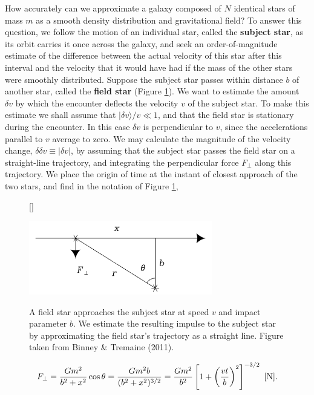 \documentclass[a4paper,10pt]{article}
\begin{document}
{\noindent}How accurately can we approximate a galaxy composed of $N$ identical stars of mass $m$ as a smooth density distribution and gravitational field? To answer this question, we follow the motion of an individual star, called the \textbf{subject star}, as its orbit carries it once across the galaxy, and seek an order-of-magnitude estimate of the difference between the actual velocity of this star after this interval and the velocity that it would have had if the mass of the other stars were smoothly distributed. Suppose the subject star passes within distance $b$ of another star, called the \textbf{field star} (Figure \ref{fig:fieldstar}). We want to estimate the amount $\delta v$ by which the encounter deflects the velocity $v$ of the subject star. To make this estimate we shall assume that $\lvert\delta v\rangle/v\ll1$, and that the field star is stationary during the encounter. In this case $\delta v$ is perpendicular to $v$, since the accelerations parallel to $v$ average to zero. We may calculate the magnitude of the velocity change, $\delta δv\equiv\lvert\delta v\rvert$, by assuming that the subject star passes the field star on a straight-line trajectory, and integrating the perpendicular force $F_\perp$ along this trajectory. We place the origin of time at the instant of closest approach of the two stars, and find in the notation of Figure \ref{fig:fieldstar},

\begin{figure}[h]
    [\FBwidth]
    {\caption{\footnotesize{A field star approaches the subject star at speed $v$ and impact parameter $b$. We estimate the resulting impulse to the subject star by approximating the field star's trajectory as a straight line. Figure taken from Binney \& Tremaine (2011).}} 
    \label{fig:fieldstar}}
    {\includegraphics[width=8cm]{figures/FieldStar.png}}
\end{figure}

\begin{align*}
    F_\perp = \frac{Gm^2}{b^2+x^2}\cos\theta = \frac{Gm^2b}{(b^2+x^2)^{3/2}} = \frac{Gm^2}{b^2} \left[ 1+\left(\frac{vt}{b}\right)^2 \right]^{-3/2} ~ [{\rm N}].
\end{align*}
\end{document}
